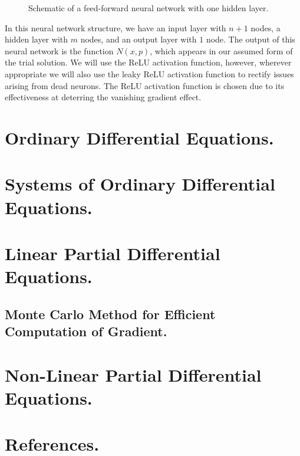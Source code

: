 \documentclass[10pt]{article}
\theoremstyle{plain}
\theoremstyle{definition}
\theoremstyle{remark}
\numberwithin{theorem}{section}
\numberwithin{proposition}{section}
\numberwithin{remark}{section}
\numberwithin{corollary}{section}
\numberwithin{definition}{section}
\numberwithin{lemma}{section}
\numberwithin{equation}{section}
\begin{document}
\begin{figure} [H]
\caption{Schematic of a feed-forward neural network with one hidden layer.}
\end{figure}
In this neural network structure, we have an input layer with $n+1$ nodes, a hidden layer with $m$ nodes, and an output layer with $1$ node. The output of this neural network is the function $N(x,p)$, which appears in our assumed form of the trial solution. We will use the ReLU activation function, however, wherever appropriate we will also use the leaky ReLU activation function to rectify issues arising from dead neurons. The ReLU activation function is chosen due to its effectiveness at deterring the vanishing gradient effect. 
\section{Ordinary Differential Equations.}
\section{Systems of Ordinary Differential Equations.}
\section{Linear Partial Differential Equations.}
\subsection{Monte Carlo Method for Efficient Computation of Gradient.}
\section{Non-Linear Partial Differential Equations.}
\section{References.} 
\end{document}
